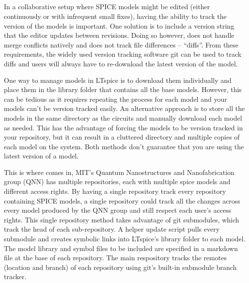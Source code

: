 \subsection{} \label{qnn-spice}

In a collaborative setup where SPICE models might be edited (either continuously or with infrequent small fixes), 
having the ability to track the version of the models is important. One solution is to include a version 
string that the editor updates between revisions. Doing so however, does not handle merge conflicts natively and
does not track file differences -- ``diffs''. From these requirements, the widely used version tracking software git can be
used to track diffs and users will always have to re-download the latest version of the model.

One way to manage models in LTspice is to download them individually and place them in the library folder that contains 
all the base models. However, this can be tedious as it requires repeating the process for each model and your
models can't be version tracked easily. An alternative
approach is to store all the models in the same directory as the circuits and manually download each model as needed. 
This has the advantage of forcing the models to be version tracked in your repository, but it can result in a cluttered 
directory and multiple copies of each model on the system. Both methods don't guarantee that you are using the latest
version of a model.

This is where  comes in, MIT's Quantum Nanostructures and Nanofabrication group (QNN) has multiple
repositories, each with multiple spice models and different access rights. By having a single repository track every repository containing
SPICE models, a single repository could track all the changes across every model produced by the QNN group and still respect each user's access rights. 
This single repository method takes advantage of git submodules, which track the head of each sub-repository.
A helper update script pulls every submodule and creates symbolic links into LTspice's library folder to each model.
The model library and symbol files to be included are specified in a markdown file at the base of each repository. The main respository tracks the
remotes (location and branch) of each repository using git's built-in submodule branch tracker.

